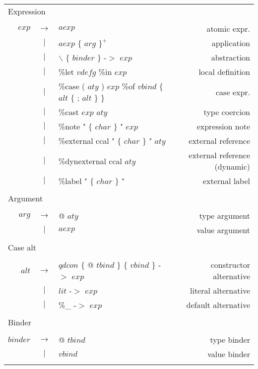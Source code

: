 \begin{scriptsize}
\begin{longtable}{ r c l r }
\multicolumn{4}{l}{Expression}			 \\
\\[0.01in]
$exp$		& $ \rightarrow $	& $aexp$										& atomic expr.		\\
		& $ | $			& $aexp$ $\{$ $arg$ $\}^{+}$ 								& application		\\
		& $ | $			& $\backslash$ $\{$ $binder$ $\}$ -$>$ $exp$						& abstraction		\\
		& $ | $			& \%let	$vdefg$ \%in $exp$								& local definition	\\
		& $ | $			& \%case ( $aty$ ) $exp$ \%of $vbind$ $\{$ $alt$ $\{$ ; $alt$ $\}$ $\}$			& case expr.		\\
		& $ | $			& \%cast $exp$ $aty$									& type coercion		\\
		& $ | $			& \%note "  $\{$ $char$ $\}$ " $exp$							& expression note	\\
		& $ | $			& \%external ccal " $\{$ $char$ $\}$ " $aty$						& external reference	\\
		& $ | $			& \%dynexternal ccal $aty$								& external reference (dynamic)	\\
		& $ | $			& \%label " $\{$ $char$ $\}$ "								& external label	\\
\\[0.01in]

\multicolumn{4}{l}{Argument}			 \\
\\[0.01in]
$arg$		& $ \rightarrow $	& @ $aty$										& type argument		\\
		& $ | $			& $aexp$										& value argument	\\
\\[0.01in]

\multicolumn{4}{l}{Case alt}			 \\
\\[0.01in]
$alt$		& $ \rightarrow $	& $qdcon$ $\{$ @ $tbind$ $\}$ $\{$ $vbind$ $\}$ -$>$ $exp$				& constructor alternative \\
		& $ | $			& $lit$ -$>$ $exp$									& literal alternative 	\\
		& $ | $			& \%\_ -$>$ $exp$									& default alternative	\\
\\[0.01in]

\multicolumn{4}{l}{Binder}			 \\
\\[0.01in]
$binder$	& $ \rightarrow $	& @ $tbind$										& type binder		\\
		& $ | $			& $vbind$										& value binder		\\
\\[0.01in]


\end{longtable}
\end{scriptsize}
